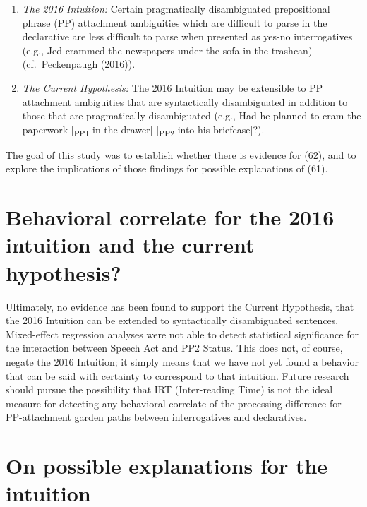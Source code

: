 \documentclass[12pt,oneside]{book}
\begin{document}
\begin{enumerate}
\def\labelenumi{(\arabic{enumi})}
\setcounter{enumi}{60}
\item
  \emph{The 2016 Intuition:} Certain pragmatically disambiguated prepositional phrase (PP) attachment ambiguities which are difficult to parse in the declarative are less difficult to parse when presented as yes-no interrogatives (e.g., Jed crammed the newspapers under the sofa in the trashcan) (cf.~Peckenpaugh (2016)).
\item
  \emph{The Current Hypothesis:} The 2016 Intuition may be extensible to PP attachment ambiguities that are syntactically disambiguated in addition to those that are pragmatically disambiguated (e.g., Had he planned to cram the paperwork {[}\textsubscript{PP1} in the drawer{]} {[}\textsubscript{PP2} into his briefcase{]}?).
\end{enumerate}

The goal of this study was to establish whether there is evidence for (62), and to explore the implications of those findings for possible explanations of (61).

\hypertarget{behavioral-correlate-for-the-2016-intuition-and-the-current-hypothesis}{%
\section{Behavioral correlate for the 2016 intuition and the current hypothesis?}\label{behavioral-correlate-for-the-2016-intuition-and-the-current-hypothesis}}


Ultimately, no evidence has been found to support the Current Hypothesis, that the 2016 Intuition can be extended to syntactically disambiguated sentences. Mixed-effect regression analyses were not able to detect statistical significance for the interaction between Speech Act and PP2 Status. This does not, of course, negate the 2016 Intuition; it simply means that we have not yet found a behavior that can be said with certainty to correspond to that intuition. Future research should pursue the possibility that IRT (Inter-reading Time) is not the ideal measure for detecting any behavioral correlate of the processing difference for PP-attachment garden paths between interrogatives and declaratives.

\hypertarget{on-possible-explanations-for-the-intuition}{%
\section{On possible explanations for the intuition}\label{on-possible-explanations-for-the-intuition}}
\end{document}
